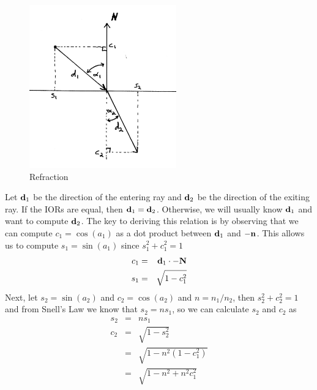 \documentclass{book}
\newcommand{\vect}[1]{{\bf{ #1}}}
\begin{document}
\begin{figure}[h]
\centering
\includegraphics[width=2.5in]{images/refraction.jpg}
\caption{Refraction}
\end{figure}



Let ${\vect d}_1$ be the direction of the entering ray and ${\vect d}_2$ be the direction of the exiting ray.
If the IORs are equal, then ${\vect d}_1= {\vect d}_2$. Otherwise, we will usually know ${\vect d}_1$
and want to compute ${\vect d}_2$. The key to deriving this relation is by observing that
we can compute $c_1 = \cos(a_1)$ as a dot product between ${\vect d_1}$ and ${- \vect n}$.
This allows us to compute $s_1 = \sin(a_1)$ since $s_1^2 + c_1^2 = 1$
\begin{eqnarray*}
c_1 &=& {\vect d_1} \cdot {- \vect N} \\
s_1 &=& \sqrt{1 - c_1^2}
\end{eqnarray*}
Next, let $s_2 = \sin(a_2)$ and $c_2 = \cos(a_2)$ and $n = n_1/n_2$, then $s_2^2 + c_2^2 = 1$ and
from Snell's Law we know that $s_2 = n s_1$, so we can calculate $s_2$ and $c_2$ as
\begin{eqnarray*}
s_2 &=& n s_1 \\
c_2 &=& \sqrt{1 - s_2^2} \\
   &=& \sqrt{1 - n^2(1 - c_1^2)} \\
   &=& \sqrt{1 - n^2 + n^2 c_1^2} \\
\end{eqnarray*}
\end{document}
